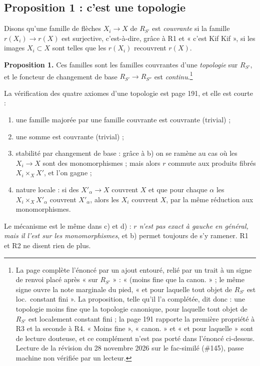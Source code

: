 \documentclass[11pt,a4paper]{article}
\begin{document}
\subsection*{Proposition 1 : c'est une topologie}

Disons qu'une famille de flèches $X_{i} \to X$ de $R_{S'}$ est
\emph{couvrante} si la famille $r(X_{i}) \to r(X)$ est surjective,
c'est-à-dire, grâce à R1 et « c'est Kif Kif », si les images $X_{i} \subset X$
sont telles que les $r(X_{i})$ recouvrent $r(X)$.

\textbf{Proposition 1.} Ces familles sont les familles couvrantes d'une
\emph{topologie} sur $R_{S'}$, et le foncteur de changement de base
$R_{S'} \to R_{S''}$ est \emph{continu}.\footnote{La page complète l'énoncé
par un ajout entouré, relié par un trait à un signe de renvoi placé après
« sur $R_{S'}$ » : « (moins fine que la canon. » ; le même signe ouvre la
note marginale du pied, « et pour laquelle tout objet de $R_{S'}$ est loc.\
constant fini ». La proposition, telle qu'il l'a complétée, dit donc : une
topologie moins fine que la topologie canonique, pour laquelle tout objet de
$R_{S'}$ est localement constant fini ; la page 191 rapporte la première
propriété à R3 et la seconde à R4. « Moins fine », « canon. » et « et pour
laquelle » sont de lecture douteuse, et ce complément n'est pas porté dans
l'énoncé ci-dessus. Lecture de la révision du 28 novembre 2026 sur le fac-similé (\#145), passe machine non vérifiée par un lecteur.}

La vérification des quatre axiomes d'une topologie est page 191, et elle est
courte :

\begin{enumerate}
  \item[a)] une famille majorée par une famille couvrante est couvrante
    (trivial) ;
  \item[b)] une somme est couvrante (trivial) ;
  \item[c)] stabilité par changement de base : grâce à b) on se ramène au cas
    où les $X_{i} \to X$ sont des monomorphismes ; mais alors $r$ commute aux
    produits fibrés $X_{i} \times_{X} X'$, et l'on gagne ;
  \item[d)] nature locale : si des $X'_{\alpha} \to X$ couvrent $X$ et que pour
    chaque $\alpha$ les $X_{i} \times_{X} X'_{\alpha}$ couvrent
    $X'_{\alpha}$, alors les $X_{i}$ couvrent $X$, par la même réduction aux
    monomorphismes.
\end{enumerate}

Le mécanisme est le même dans c) et d) : \emph{$r$
n'est pas exact à gauche en général, mais il l'est sur les monomorphismes},
et b) permet toujours de s'y ramener. R1 et R2 ne disent rien de plus.
\end{document}
